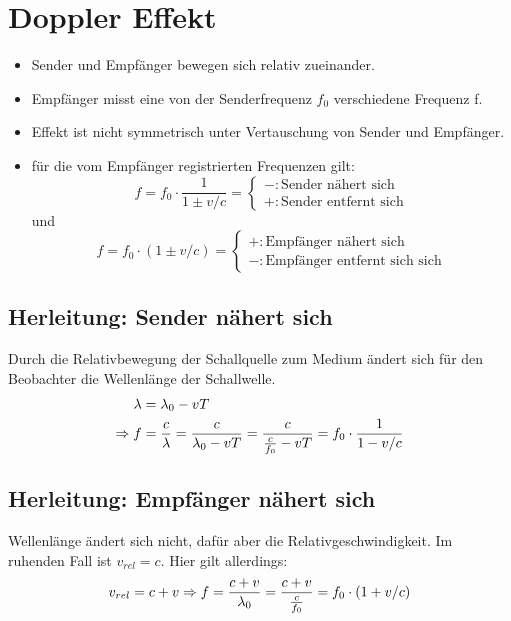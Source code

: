 \documentclass[10pt,a4paper]{article}
\begin{document}
\section{Doppler Effekt}
\begin{itemize}
\item Sender und Empfänger bewegen sich relativ zueinander.
\item Empfänger misst eine von der Senderfrequenz $f_0$ verschiedene Frequenz f.
\item Effekt ist nicht symmetrisch unter Vertauschung von Sender und Empfänger.
\item für die vom Empfänger registrierten Frequenzen gilt:
\begin{equation}
f=f_0\cdot \frac{1}{1\pm v/c} =
	\begin{cases}
	-: \text{Sender nähert sich} \\
	+: \text{Sender entfernt sich} 
	\end{cases}
\end{equation}
und 
\begin{equation}
f=f_0\cdot (1 \pm v/c) =
	\begin{cases}
	+: \text{Empfänger nähert sich} \\
	-: \text{Empfänger entfernt sich  sich}
	\end{cases}
\end{equation}
\end{itemize}
\subsection{Herleitung: Sender nähert sich}
Durch die Relativbewegung der Schallquelle zum Medium ändert sich für den Beobachter die Wellenlänge der Schallwelle.
\begin{align}
\lambda&=\lambda_0-vT \notag \\
\Rightarrow f&=\frac{c}{\lambda}=\frac{c}{\lambda_0-vT}=\frac{c}{\frac{c}{f_0}-vT}=f_0\cdot \frac{1}{1- v/c} \notag
\end{align}
\subsection{Herleitung: Empfänger nähert sich}
Wellenlänge ändert sich nicht, dafür aber die Relativgeschwindigkeit. Im ruhenden Fall ist $v_{rel}=c$. Hier gilt allerdings:
\begin{align}
v_{rel}=c+v \Rightarrow f=\frac{c+v}{\lambda_0}=\frac{c+v}{\frac{c}{f_0}}=f_0\cdot (1 + v/c) \notag
\end{align}
\end{document}

